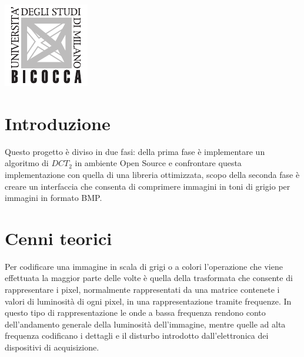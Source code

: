 \documentclass[a4paper,12pt,titlepage,oneside]{book}
\begin{document}
\begin{titlepage}

\includegraphics[scale = 2.5]{src/image/unimib-logo.pdf}\\[1cm] %
 

\vfill %

\end{titlepage}

\tableofcontents

\chapter{Introduzione}
Questo progetto è diviso in due fasi: della prima fase è implementare un algoritmo di $DCT_2$ in ambiente Open Source e confrontare questa implementazione con quella di una libreria ottimizzata, scopo della seconda fase è creare un interfaccia che consenta di comprimere immagini in toni di grigio per immagini in formato BMP.

\chapter{Cenni teorici}

Per codificare una immagine in scala di grigi o a colori l'operazione che viene effettuata la maggior parte delle volte è quella della trasformata che consente di rappresentare i pixel, normalmente rappresentati da una matrice contenete i valori di luminosità di ogni pixel, in una rappresentazione tramite frequenze. In questo tipo di rappresentazione le onde a bassa frequenza rendono conto dell'andamento generale della luminosità dell'immagine, mentre quelle ad alta frequenza codificano i dettagli e il disturbo introdotto dall'elettronica dei dispositivi di acquisizione.
\end{document}

